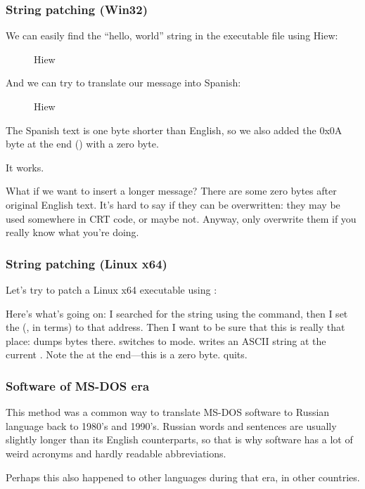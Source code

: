 \subsubsection{String patching (Win32)}

We can easily find the ``hello, world'' string in the executable file using Hiew:

\begin{figure}[H]
\centering
{}
\caption{Hiew}
\label{}
\end{figure}

And we can try to translate our message into Spanish:

\begin{figure}[H]
\centering
{}
\caption{Hiew}
\label{}
\end{figure}

The Spanish text is one byte shorter than English, so we also added the 0x0A byte at the end () with a zero byte.

It works.

What if we want to insert a longer message?
There are some zero bytes after original English text.
It's hard to say if they can be overwritten: they may be used somewhere in \ac{CRT} code, or maybe not.
Anyway, only overwrite them if you really know what you're doing.

\subsubsection{String patching (Linux x64)}

\myindex{\radare}
Let's try to patch a Linux x64 executable using \radare{}:



Here's what's going on: I searched for the  string using the \TT{/} command,
then I set the  (, in \radare{} terms) to that address.
Then I want to be sure that this is really that place:  dumps bytes there.
 switches \radare{} to  mode.
 writes an ASCII string at the current .
Note the  at the end---this is a zero byte.
 quits.

\subsubsection{Software  of MS-DOS era}

This method was a common way to translate MS-DOS software to Russian language back to 1980's and 1990's.
Russian words and sentences are usually slightly longer than its English counterparts, so that is why 
software has a lot of weird acronyms and hardly readable abbreviations.

Perhaps this also happened to other languages during that era, in other countries.
